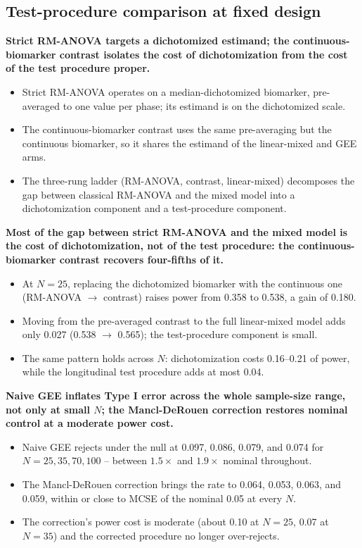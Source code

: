 \documentclass[
  11pt,
]{article}
\begin{document}
\subsection{Test-procedure comparison at fixed design}\label{test-procedure-comparison-at-fixed-design}

\textbf{Strict RM-ANOVA targets a dichotomized estimand; the continuous-biomarker contrast isolates the cost of dichotomization from the cost of the test procedure proper.}

\begin{itemize}\setlength{\itemsep}{2pt}\setlength{\parskip}{0pt}
\item Strict RM-ANOVA operates on a median-dichotomized biomarker, pre-averaged to one value per phase; its estimand is on the dichotomized scale.
\item The continuous-biomarker contrast uses the same pre-averaging but the continuous biomarker, so it shares the estimand of the linear-mixed and GEE arms.
\item The three-rung ladder (RM-ANOVA, contrast, linear-mixed) decomposes the gap between classical RM-ANOVA and the mixed model into a dichotomization component and a test-procedure component.
\end{itemize}

\textbf{Most of the gap between strict RM-ANOVA and the mixed model is the cost of dichotomization, not of the test procedure: the continuous-biomarker contrast recovers four-fifths of it.}

\begin{itemize}\setlength{\itemsep}{2pt}\setlength{\parskip}{0pt}
\item At $N = 25$, replacing the dichotomized biomarker with the continuous one (RM-ANOVA $\to$ contrast) raises power from 0.358 to 0.538, a gain of 0.180.
\item Moving from the pre-averaged contrast to the full linear-mixed model adds only 0.027 (0.538 $\to$ 0.565); the test-procedure component is small.
\item The same pattern holds across $N$: dichotomization costs 0.16--0.21 of power, while the longitudinal test procedure adds at most 0.04.
\end{itemize}

\textbf{Naive GEE inflates Type I error across the whole sample-size range, not only at small $N$; the Mancl-DeRouen correction restores nominal control at a moderate power cost.}

\begin{itemize}\setlength{\itemsep}{2pt}\setlength{\parskip}{0pt}
\item Naive GEE rejects under the null at 0.097, 0.086, 0.079, and 0.074 for $N = 25, 35, 70, 100$ -- between $1.5\times$ and $1.9\times$ nominal throughout.
\item The Mancl-DeRouen correction brings the rate to 0.064, 0.053, 0.063, and 0.059, within or close to MCSE of the nominal 0.05 at every $N$.
\item The correction's power cost is moderate (about 0.10 at $N = 25$, 0.07 at $N = 35$) and the corrected procedure no longer over-rejects.
\end{itemize}
\end{document}
